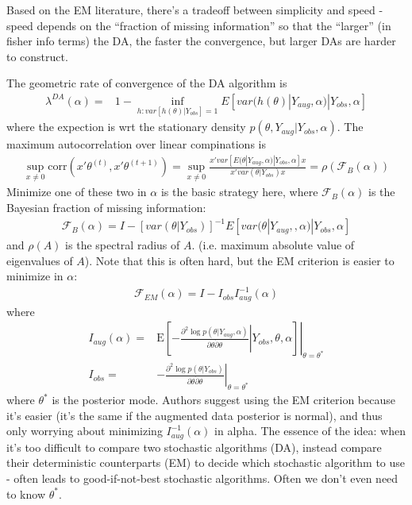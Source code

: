 \documentclass{article}\usepackage[]{graphicx}\usepackage[]{color}
\begin{document}
Based on the EM literature, there's a tradeoff between simplicity and speed - speed depends on the ``fraction of missing information'' so that the ``larger'' (in fisher info terms) the DA, the faster the convergence, but larger DAs are harder to construct.

The geometric rate of convergence of the DA algorithm is
\begin{align*}
  \lambda^{DA}(\alpha) = & 1 - \inf_{h:var[h(\theta)|Y_{obs}]=1}E[var(h(\theta)|Y_{aug},\alpha)|Y_{obs},\alpha]
\end{align*}
where the expection is wrt the stationary density $p(\theta, Y_{aug}|Y_{obs},\alpha)$. The maximum autocorrelation over linear compinations is
\begin{align*}
  \sup_{x\neq 0}\mathrm{corr}(x'\theta^{(t)},x'\theta^{(t+1)})=\sup_{x\neq 0}\frac{x'var[E(\theta|Y_{aug},\alpha)|Y_{obs},\alpha]x}{x'var(\theta|Y_{obs})x}=\rho(\mathcal{F}_B(\alpha))
\end{align*}
Minimize one of these two in $\alpha$ is the basic strategy here, where $\mathcal{F}_B(\alpha)$ is the Bayesian fraction of missing information:
\begin{align*}
  \mathcal{F}_B(\alpha) = I - [var(\theta|Y_{obs})]^{-1}E[var(\theta|Y_{aug},,\alpha)|Y_{obs},\alpha]
\end{align*}
and $\rho(A)$ is the spectral radius of $A$. (i.e. maximum absolute value of eigenvalues of $A$). Note that this is often hard, but the EM criterion is easier to minimize in $\alpha$:
\begin{align*}
  \mathcal{F}_{EM}(\alpha) = I - I_{obs}I_{aug}^{-1}(\alpha)
\end{align*}
where 
\begin{align*}
  I_{aug}(\alpha) =& \left.\mathrm{E} \left[-\left.\frac{\partial^2 \log p(\theta|Y_{aug},\alpha)}{\partial \theta \dot \partial \theta}\right| Y_{obs},\theta,\alpha\right]\right|_{\theta=\theta^*}\\
  I_{obs} =& -\left.\frac{\partial^2\log p(\theta|Y_{obs})}{\partial\theta \dot \partial\theta}\right|_{\theta=\theta^*}
\end{align*}
where $\theta^*$ is the posterior mode. Authors suggest using the EM criterion because it's easier (it's the same if the augmented data posterior is normal), and thus only worrying about minimizing $I_{aug}^{-1}(\alpha)$ in alpha. The essence of the idea: when it's too difficult to compare two stochastic algorithms (DA), instead compare their deterministic counterparts (EM) to decide which stochastic algorithm to use - often leads to good-if-not-best stochastic algorithms. Often we don't even need to know $\theta^*$.
\end{document}

